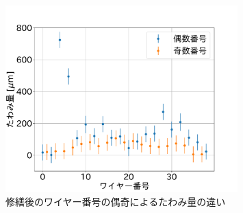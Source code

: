\documentclass[../../main.tex]{subfiles}
\begin{document}
\begin{figure}[H]
    \centering
    \includegraphics[width=0.8\textwidth]{wiresag_swg/swg_sag_after_even_odd.pdf}
    \caption{修繕後のワイヤー番号の偶奇によるたわみ量の違い}
    \label{fig:wiresag_swg_even_odd_repair}
\end{figure}
\end{document}

